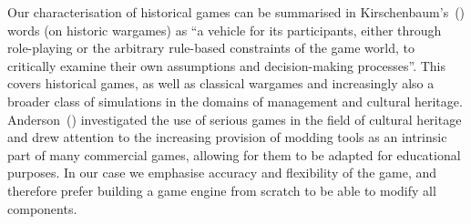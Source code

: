 \documentclass[11pt]{article}
\begin{document}

Our characterisation of historical games can be summarised
in Kirschenbaum's~(\cite*{Kirschenbaum}) words (on historic wargames) as ``a vehicle for its participants,
either through role-playing or the arbitrary rule-based constraints of
the game world, to critically examine their own assumptions and
decision-making processes''. 
This covers historical games, as well as classical wargames and increasingly
also a broader class of simulations in the domains of management and cultural heritage. 
Anderson~(\cite*{Anderson}) investigated the use of serious games
in the field of cultural heritage and drew attention to the increasing
provision of modding tools as an intrinsic part of many commercial
games, allowing for them to be adapted for educational purposes. 
In our case we emphasise accuracy and flexibility of the game, and therefore
prefer building a game engine from scratch to be able to modify all components.
\end{document}
